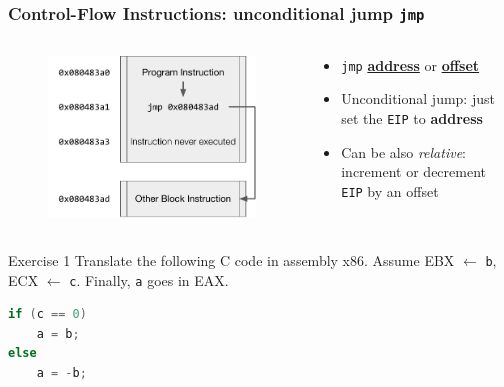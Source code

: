 \documentclass[]{beamer}
\begin{document}
\begin{frame}
  \frametitle{Control-Flow Instructions: unconditional jump {\tt jmp}}
  \begin{columns}
    \begin{column}{0.4\columnwidth}
      \begin{figure}
        \includegraphics[width=1.1\textwidth]{images/x86-jmp.pdf}

        \label{Control Flow JMP}
      \end{figure}
    \end{column}
    \begin{column}{0.6\columnwidth}
      \begin{itemize}
	      \item{{\tt jmp} \underline{\textbf{address}} or \underline{\textbf{offset}}}\\
	      \item Unconditional jump: just set the {\tt EIP} to \textbf{address}
	      \item Can be also \emph{relative}: increment or decrement {\tt EIP} by an offset
      \end{itemize}
    \end{column}
  \end{columns}
\end{frame}

\begin{frame}[fragile]{Exercise 1}
  Translate the following C code in assembly x86. Assume EBX $\leftarrow$ \texttt{b}, ECX $\leftarrow$ \texttt{c}. Finally, \texttt{a} goes in EAX.
  \begin{lstlisting}[language={C}]
if (c == 0)
    a = b;
else
    a = -b;
  \end{lstlisting}
\end{frame}
\end{document}
